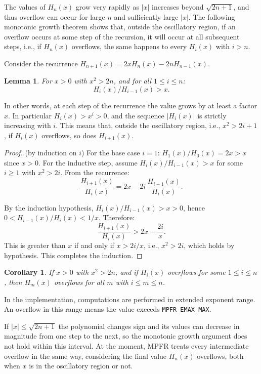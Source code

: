 \documentclass[12pt]{amsart}
\newtheorem{lemma}{Lemma}
\newtheorem{corollary}{Corollary}
\begin{document}
The values of $H_n(x)$ grow very rapidly as $|x|$ increases beyond $\sqrt{2n+1}$,
and thus overflow can occur for large $n$ and sufficiently large $|x|$.
The following monotonic growth theorem shows that, outside the oscillatory region,
if an overflow occurs at some step of the recursion, it will occur at
all subsequent steps, i.e., if $H_n(x)$ overflows, the same happens to every
$H_i(x)$ with $i > n$.

\noindent Consider the recurrence $H_{n+1}(x) = 2x H_n(x) - 2n H_{n-1}(x)$.

\begin{lemma}
For $x > 0$ with $x^2 > 2n$, and for all $1 \le i \le n$:
\[
  H_i(x) / H_{i-1}(x) > x.
\]
\end{lemma}

In other words, at each step of the recurrence the value grows by at
least a factor $x$. In particular $H_i(x) > x^i > 0$, and the sequence
$|H_i(x)|$ is strictly increasing with $i$. This means that, outside
the oscillatory region, i.e., $x^2 > 2i + 1$, if $H_i(x)$ overflows,
so does $H_{i+1}(x)$.

\begin{proof}{(by induction on $i$)}
For the base case $i = 1$: $H_1(x)/H_0(x) = 2x > x$ since $x > 0$.
For the inductive step, assume $H_i(x)/H_{i-1}(x) > x$ for some
$i \ge 1$ with $x^2 > 2i$.
From the recurrence:
\[
  \frac{H_{i+1}(x)}{H_i(x)} = 2x - 2i \, \frac{H_{i-1}(x)}{H_i(x)}.
\]

By the induction hypothesis, $H_i(x)/H_{i-1}(x) > x > 0$, hence
$0 < H_{i-1}(x)/H_i(x) < 1/x$. Therefore:
\[
  \frac{H_{i+1}(x)}{H_i(x)} > 2x - \frac{2i}{x}.
\]
This is greater than $x$ if and only if $x > 2i/x$, i.e., $x^2 > 2i$,
which holds by hypothesis. This completes the induction.
\end{proof}

\begin{corollary}
If $x > 0$ with $x^2 > 2n$, and if $H_i(x)$ overflows for some
$1 \le i \le n$, then $H_m(x)$ overflows for all $m$ with
$i \le m \le n$.
\end{corollary}

In the implementation, computations are performed in extended exponent
range. An overflow in this range
means the value exceeds \texttt{MPFR\_EMAX\_MAX}.

If $|x| \leq \sqrt{2n+1}$ the polynomial changes sign and its values can
decrease in magnitude from one step to the next, so the monotonic growth
argument does not hold within this interval. At the moment, MPFR treats every
intermediate overflow in the same way, considering the final value
$H_n(x)$ overflows, both when $x$ is in the oscillatory region or not.
\end{document}
